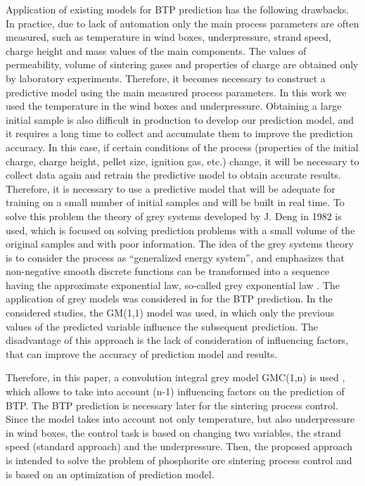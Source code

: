 \documentclass[AMS,STIX2COL]{WileyNJD-v2}
\begin{document}
Application of existing models for BTP prediction has the following drawbacks. In practice, due to lack of automation only the main process parameters are often measured, such as temperature in wind boxes, underpressure, strand speed, charge height and mass values of the main components. The values of permeability, volume of sintering gases and properties of charge are obtained only by laboratory experiments. Therefore, it becomes necessary to construct a predictive model using the main measured process parameters. In this work we used the temperature in the wind boxes and underpressure. Obtaining a large initial sample is also difficult in production to develop our prediction model, and it requires a long time to collect and accumulate them to improve the prediction accuracy. In this case, if certain conditions of the process (properties of the initial charge, charge height, pellet size, ignition gas, etc.) change, it will be necessary to collect data again and retrain the predictive model to obtain accurate results. Therefore, it is necessary to use a predictive model that will be adequate for training on a small number of initial samples and will be built in real time. To solve this problem the theory of grey systems developed by J. Deng in 1982 is used, which is focused on solving prediction problems with a small volume of the original samples and with poor information. The idea of the grey systems theory is to consider the process as \textquotedblleft generalized energy system\textquotedblright, and emphasizes that non-negative smooth discrete functions can be transformed into a sequence having the approximate exponential law, so-called grey exponential law \cite{DengJ1989}. The application of grey models was considered in \cite{Wu2012, Wu2012b} for the BTP prediction. In the considered studies, the GM(1,1) model was used, in which only the previous values of the predicted variable influence the subsequent prediction. The disadvantage of this approach is the lack of consideration of influencing factors, that can improve the accuracy of prediction model and results. 

Therefore, in this paper, a convolution  integral  grey model GMC(1,n) is used \cite{Tien2005}, which allows to take into account (n-1) influencing factors on the prediction of BTP. The BTP prediction is necessary later for the sintering process control. Since the model takes into account not only temperature, but also underpressure in wind boxes, the control task is based on changing two variables, the strand speed (standard approach) and the underpressure. Then, the proposed approach is intended to solve the problem of phosphorite ore sintering process control and is based on an optimization of prediction model.
\end{document}
